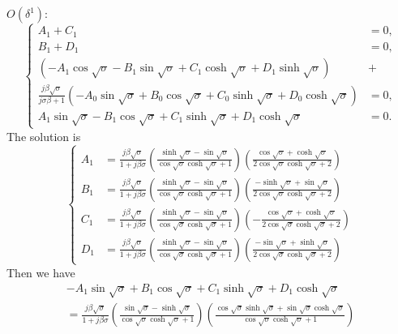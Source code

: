 \documentclass{article}
\begin{document}
\noindent
$O(\delta^1)$:
\begin{equation}
    \left\{\begin{aligned}
        A_1 + C_1 &= 0, \\
        B_1 + D_1 &= 0, \\
        \left( - A_1 \cos{\sqrt{\sigma}} - B_1 \sin{\sqrt{\sigma}} + C_1 \cosh{\sqrt{\sigma}} + D_1 \sinh{\sqrt{\sigma}} \right) &+ \\
        \frac{j \beta \sqrt{\sigma}}{ j\sigma \beta + 1 } \left( - A_0 \sin{\sqrt{\sigma}} + B_0 \cos{\sqrt{\sigma}} + C_0 \sinh{\sqrt{\sigma}} + D_0 \cosh{\sqrt{\sigma}} \right) &= 0, \\
        A_1 \sin{\sqrt{\sigma}} - B_1 \cos{\sqrt{\sigma}} + C_1 \sinh{\sqrt{\sigma}} + D_1 \cosh{\sqrt{\sigma}} &= 0.
    \end{aligned}\right.
\end{equation}
The solution is
\begin{equation}
    \left\{\begin{aligned}
        A_1 &= \frac{j \beta  \sqrt{\sigma }}{1+j \beta  \sigma } \left( \frac{\sinh\sqrt{\sigma }-\sin\sqrt{\sigma }}{\cos\sqrt{\sigma } \cosh\sqrt{\sigma }+1} \right) \left(\frac{\cos\sqrt{\sigma }+\cosh\sqrt{\sigma }}{2 \cos\sqrt{\sigma }\cosh\sqrt{\sigma }+2} \right) \\
        B_1 &= \frac{j \beta  \sqrt{\sigma }}{1+j \beta  \sigma } \left( \frac{\sinh\sqrt{\sigma }-\sin\sqrt{\sigma }}{\cos\sqrt{\sigma } \cosh\sqrt{\sigma }+1} \right) \left( \frac{-\sinh\sqrt{\sigma }+\sin\sqrt{\sigma }}{2 \cos\sqrt{\sigma }\cosh\sqrt{\sigma }+2} \right)\\
        C_1 &= \frac{j \beta  \sqrt{\sigma }}{1+j \beta  \sigma } \left( \frac{\sinh\sqrt{\sigma }-\sin\sqrt{\sigma }}{\cos\sqrt{\sigma } \cosh\sqrt{\sigma }+1} \right) \left( -\frac{\cos\sqrt{\sigma }+\cosh\sqrt{\sigma }}{2 \cos\sqrt{\sigma } \cosh\sqrt{\sigma }+2} \right)\\
        D_1 &= \frac{j \beta  \sqrt{\sigma }}{1+j \beta  \sigma } \left( \frac{\sinh\sqrt{\sigma }-\sin\sqrt{\sigma }}{\cos\sqrt{\sigma } \cosh\sqrt{\sigma }+1} \right) \left( \frac{-\sin\sqrt{\sigma }+\sinh\sqrt{\sigma }}{2 \cos\sqrt{\sigma }\cosh\sqrt{\sigma }+2} \right)
    \end{aligned}\right.
\end{equation}
Then we have
\begin{equation}
    \begin{aligned}
        - A_1 \sin{\sqrt{\sigma}} + B_1 \cos{\sqrt{\sigma}} + C_1 \sinh{\sqrt{\sigma}} + D_1 \cosh{\sqrt{\sigma}} \\
        = \frac{j \beta  \sqrt{\sigma }}{1+j \beta  \sigma } \left(\frac{\sin\sqrt{\sigma } -\sinh\sqrt{\sigma }}{\cos\sqrt{\sigma } \cosh\sqrt{\sigma }+1} \right)  \left( \frac{\cos\sqrt{\sigma } \sinh\sqrt{\sigma }+\sin\sqrt{\sigma } \cosh\sqrt{\sigma }}{\cos\sqrt{\sigma } \cosh\sqrt{\sigma }+1} \right)
    \end{aligned}
\end{equation}
\end{document}

